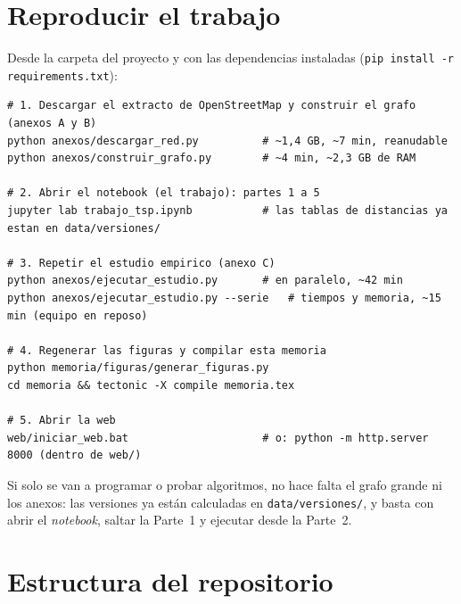 \chapter{Reproducir el trabajo}\label{ap:reproducir}

Desde la carpeta del proyecto y con las dependencias instaladas (\texttt{pip install -r requirements.txt}):

\begin{lstlisting}
# 1. Descargar el extracto de OpenStreetMap y construir el grafo (anexos A y B)
python anexos/descargar_red.py          # ~1,4 GB, ~7 min, reanudable
python anexos/construir_grafo.py        # ~4 min, ~2,3 GB de RAM

# 2. Abrir el notebook (el trabajo): partes 1 a 5
jupyter lab trabajo_tsp.ipynb           # las tablas de distancias ya estan en data/versiones/

# 3. Repetir el estudio empirico (anexo C)
python anexos/ejecutar_estudio.py       # en paralelo, ~42 min
python anexos/ejecutar_estudio.py --serie   # tiempos y memoria, ~15 min (equipo en reposo)

# 4. Regenerar las figuras y compilar esta memoria
python memoria/figuras/generar_figuras.py
cd memoria && tectonic -X compile memoria.tex

# 5. Abrir la web
web/iniciar_web.bat                     # o: python -m http.server 8000 (dentro de web/)
\end{lstlisting}

Si solo se van a programar o probar algoritmos, no hace falta el grafo grande ni los anexos: las versiones ya están calculadas en \texttt{data/versiones/}, y basta con abrir el \emph{notebook}, saltar la Parte~1 y ejecutar desde la Parte~2.

\chapter{Estructura del repositorio}\label{ap:estructura}

